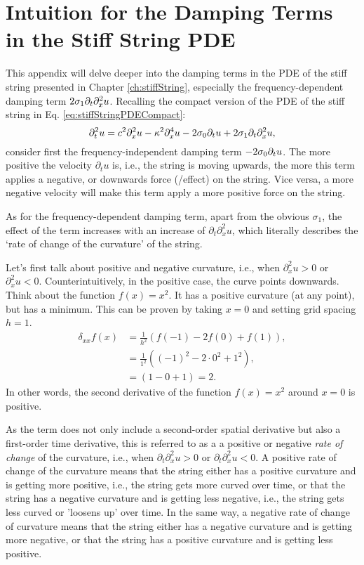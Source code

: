 \chapter{Intuition for the Damping Terms in the Stiff String PDE}\label{app:intuitionSigma1}
This appendix will delve deeper into the damping terms in the PDE of the stiff string presented in Chapter \ref{ch:stiffString}, especially the frequency-dependent damping term $2\sigma_1\partial_t\partial_x^2 u$. Recalling the compact version of the PDE of the stiff string in Eq. \eqref{eq:stiffStringPDECompact}:
\begin{equation}
    \partial_t^2 u = c^2 \partial_x^2 u - \kappa^2 \partial_x^4 u - 2 \sigma_{0} \partial_t u + 2 \sigma_{1} \partial_t \partial_x^2 u,
\end{equation}
consider first the frequency-independent damping term $-2\sigma_{0}\partial_t u$. The more positive the velocity $\partial_tu$ is, i.e., the string is moving upwards, the more this term applies a negative, or downwards force (/effect) on the string. Vice versa, a more negative velocity will make this term apply a more positive force on the string. 

As for the frequency-dependent damping term, apart from the obvious $\sigma_1$, the effect of the term increases with an increase of $\partial_t\partial_x^2u$, which literally describes the `rate of change of the curvature' of the string.

Let's first talk about positive and negative curvature, i.e., when $\partial_x^2u > 0$ or $\partial_x^2u < 0$. Counterintuitively, in the positive case, the curve points downwards. Think about the function $f(x) = x^2$. It has a positive curvature (at any point), but has a minimum. This can be proven by taking $x=0$ and setting grid spacing $h=1$.
\begin{equation}
  \begin{aligned}
  \delta_{xx}f(x) &= \frac{1}{h^2} \left(f(-1)-2f(0)+f(1)\right), \\
  &= \frac{1}{1^2} \left((-1)^2-2\cdot0^2+1^2\right),\\
  &= \left(1-0+1\right) = 2.
  \end{aligned}
\end{equation}
In other words, the second derivative of the function $f(x)=x^2$ around $x=0$ is positive.

As the term does not only include a second-order spatial derivative but also a first-order time derivative, this is referred to as a a positive or negative \textit{rate of change} of the curvature, i.e., when $\partial_t\partial_x^2u>0$ or $\partial_t\partial_x^2u<0$. A positive rate of change of the curvature means that the string either has a positive curvature and is getting more positive, i.e., the string gets more curved over time, or that the string has a negative curvature and is getting less negative, i.e., the string gets less curved or 'loosens up' over time.  In the same way, a negative rate of change of curvature means that the string either has a negative curvature and is getting more negative, or that the string has a positive curvature and is getting less positive. 

